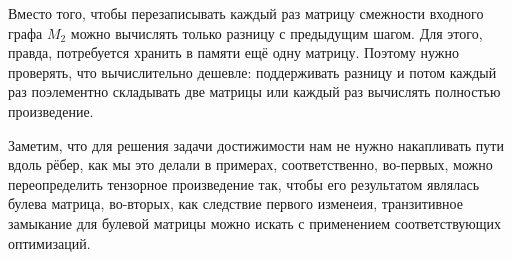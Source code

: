 Вместо того, чтобы перезаписывать каждый раз матрицу смежности входного графа $M_2$ можно вычислять только разницу с предыдущим шагом.
Для этого, правда, потребуется хранить в памяти ещё одну матрицу.
Поэтому нужно проверять, что вычислительно дешевле: поддерживать разницу и потом каждый раз поэлементно складывать две матрицы или каждый раз вычислять полностью произведение.

Заметим, что для решения задачи достижимости нам не нужно накапливать пути вдоль рёбер, как мы это делали в примерах, соответственно, во-первых, можно переопределить тензорное произведение так, чтобы его результатом являлась булева матрица, во-вторых, как следствие первого изменеия, транзитивное замыкание для булевой матрицы можно искать с применением соответствующих оптимизаций.

